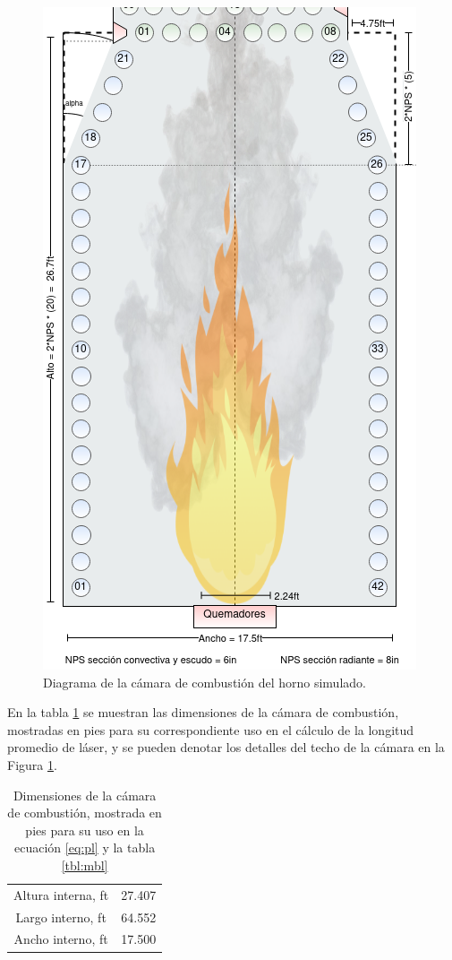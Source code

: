\begin{figure}[hbt]
\begin{center}
\includegraphics[scale=0.45]{images/firebox}
\caption[Diagrama de la cámara de combustión algoritmo]{Diagrama de la cámara de combustión del horno simulado.}
\label{fig:firebox}
\end{center}
\end{figure}

\par En la tabla \ref{tbl:firebox} se muestran las dimensiones de la cámara de combustión, mostradas en pies para su correspondiente uso en el cálculo de la longitud promedio de láser, y se pueden denotar los detalles del techo de la cámara en la Figura \ref{fig:firebox}.

\begin{table}
\begin{center}
\caption[Dimensiones de la cámara de combustión]{Dimensiones de la cámara de combustión, mostrada en pies para su uso en la ecuación \ref{eq:pl} y la tabla \ref{tbl:mbl}}
\label{tbl:firebox}
\begin{tabular}{c|c}
Altura interna, ft	& 27.407 \\
Largo interno, ft 	& 64.552 \\
Ancho interno, ft 	& 17.500 \\
\end{tabular}
\end{center}
\end{table}

